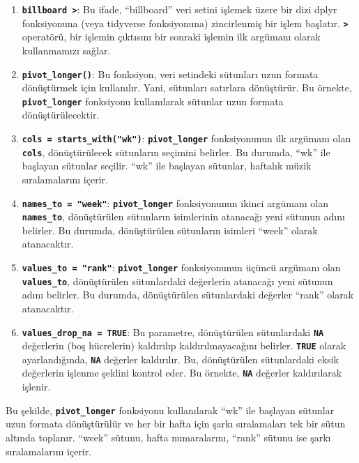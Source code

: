\documentclass[
  letterpaper,
  DIV=11,
  numbers=noendperiod]{scrreprt}
\begin{document}
\begin{enumerate}
\def\labelenumi{\arabic{enumi}.}
\item
  \textbf{\texttt{billboard\ \textbar{}\textgreater{}}}: Bu ifade,
  ``billboard'' veri setini işlemek üzere bir dizi dplyr fonksiyonuna
  (veya tidyverse fonksiyonuna) zincirlenmiş bir işlem başlatır.
  \textbf{\texttt{\textbar{}\textgreater{}}} operatörü, bir işlemin
  çıktısını bir sonraki işlemin ilk argümanı olarak kullanmamızı sağlar.
\item
  \textbf{\texttt{pivot\_longer()}}: Bu fonksiyon, veri setindeki
  sütunları uzun formata dönüştürmek için kullanılır. Yani, sütunları
  satırlara dönüştürür. Bu örnekte, \textbf{\texttt{pivot\_longer}}
  fonksiyonu kullanılarak sütunlar uzun formata dönüştürülecektir.
\item
  \textbf{\texttt{cols\ =\ starts\_with("wk")}}:
  \textbf{\texttt{pivot\_longer}} fonksiyonunun ilk argümanı olan
  \textbf{\texttt{cols}}, dönüştürülecek sütunların seçimini belirler.
  Bu durumda, ``wk'' ile başlayan sütunlar seçilir. ``wk'' ile başlayan
  sütunlar, haftalık müzik sıralamalarını içerir.
\item
  \textbf{\texttt{names\_to\ =\ "week"}}:
  \textbf{\texttt{pivot\_longer}} fonksiyonunun ikinci argümanı olan
  \textbf{\texttt{names\_to}}, dönüştürülen sütunların isimlerinin
  atanacağı yeni sütunun adını belirler. Bu durumda, dönüştürülen
  sütunların isimleri ``week'' olarak atanacaktır.
\item
  \textbf{\texttt{values\_to\ =\ "rank"}}:
  \textbf{\texttt{pivot\_longer}} fonksiyonunun üçüncü argümanı olan
  \textbf{\texttt{values\_to}}, dönüştürülen sütunlardaki değerlerin
  atanacağı yeni sütunun adını belirler. Bu durumda, dönüştürülen
  sütunlardaki değerler ``rank'' olarak atanacaktır.
\item
  \textbf{\texttt{values\_drop\_na\ =\ TRUE}}: Bu parametre,
  dönüştürülen sütunlardaki \textbf{\texttt{NA}} değerlerin (boş
  hücrelerin) kaldırılıp kaldırılmayacağını belirler.
  \textbf{\texttt{TRUE}} olarak ayarlandığında, \textbf{\texttt{NA}}
  değerler kaldırılır. Bu, dönüştürülen sütunlardaki eksik değerlerin
  işlenme şeklini kontrol eder. Bu örnekte, \textbf{\texttt{NA}}
  değerler kaldırılarak işlenir.
\end{enumerate}

Bu şekilde, \textbf{\texttt{pivot\_longer}} fonksiyonu kullanılarak
``wk'' ile başlayan sütunlar uzun formata dönüştürülür ve her bir hafta
için şarkı sıralamaları tek bir sütun altında toplanır. ``week'' sütunu,
hafta numaralarını, ``rank'' sütunu ise şarkı sıralamalarını içerir.
\end{document}
